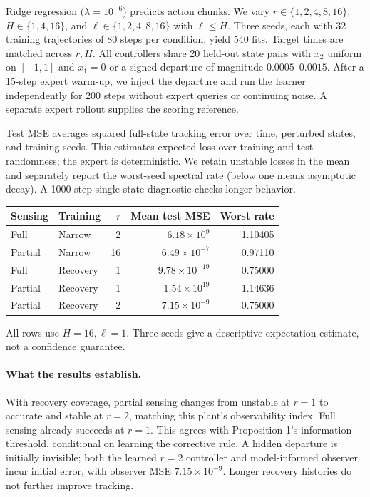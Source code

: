 \documentclass{l4dc2026}
\begin{document}
Ridge regression ($\lambda=10^{-6}$) predicts action chunks. We vary $r\in\{1,2,4,8,16\}$, $H\in\{1,4,16\}$, and $\ell\in\{1,2,4,8,16\}$ with $\ell\le H$. Three seeds, each with 32 training trajectories of 80 steps per condition, yield 540 fits. Target times are matched across $r,H$. All controllers share 20 held-out state pairs with $x_2$ uniform on $[-1,1]$ and $x_1=0$ or a signed departure of magnitude $0.0005$--$0.0015$. After a 15-step expert warm-up, we inject the departure and run the learner independently for 200 steps without expert queries or continuing noise. A separate expert rollout supplies the scoring reference.

Test MSE averages squared full-state tracking error over time, perturbed states, and training seeds. This estimates expected loss over training and test randomness; the expert is deterministic. We retain unstable losses in the mean and separately report the worst-seed spectral rate (below one means asymptotic decay). A 1000-step single-state diagnostic checks longer behavior.

\begin{center}\small
\begin{tabular}{llrrr}\toprule
Sensing & Training & $r$ & Mean test MSE & Worst rate\\\midrule
Full & Narrow & 2 & $6.18\times10^9$ & 1.10405\\
Partial & Narrow & 16 & $6.49\times10^{-7}$ & 0.97110\\
Full & Recovery & 1 & $9.78\times10^{-19}$ & 0.75000\\
Partial & Recovery & 1 & $1.54\times10^{19}$ & 1.14636\\
Partial & Recovery & 2 & $7.15\times10^{-9}$ & 0.75000\\\bottomrule
\end{tabular}
\end{center}
\noindent All rows use $H=16,\ell=1$. Three seeds give a descriptive expectation estimate, not a confidence guarantee.

\paragraph{What the results establish.}
With recovery coverage, partial sensing changes from unstable at $r=1$ to accurate and stable at $r=2$, matching this plant's observability index. Full sensing already succeeds at $r=1$. This agrees with Proposition 1's information threshold, conditional on learning the corrective rule. A hidden departure is initially invisible; both the learned $r=2$ controller and model-informed observer incur initial error, with observer MSE $7.15\times10^{-9}$. Longer recovery histories do not further improve tracking.
\end{document}

